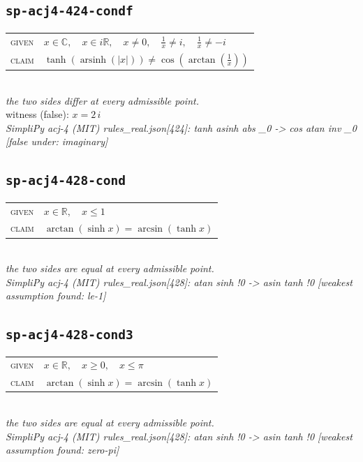 \documentclass[11pt]{article}
\begin{document}
\subsection*{\texttt{sp-acj4-424-condf}}
\begin{tabular}{@{}l@{\quad}l@{}}
\textsc{given} & $x \in \mathbb{C},\quad x \in i\mathbb{R},\quad x \neq 0,\quad \frac{1}{x} \neq i,\quad \frac{1}{x} \neq -i$ \\[4pt]
\textsc{claim} & $\displaystyle \tanh\left(\operatorname{arsinh}\left(\left|x\right|\right)\right) \neq \cos\left(\arctan\left(\frac{1}{x}\right)\right)$ \\
\end{tabular}\\[2pt]
{\small\emph{the two sides differ at every admissible point.}}\\
{\footnotesize\color{gray}witness (false): $x = 2 \, i$}\\
\emph{SimpliPy acj-4 (MIT) rules\_real.json[424]: tanh asinh abs \_0  ->  cos atan inv \_0  [false under: imaginary]}\\

\subsection*{\texttt{sp-acj4-428-cond}}
\begin{tabular}{@{}l@{\quad}l@{}}
\textsc{given} & $x \in \mathbb{R},\quad x \le 1$ \\[4pt]
\textsc{claim} & $\displaystyle \arctan\left(\sinh x\right) = \arcsin\left(\tanh x\right)$ \\
\end{tabular}\\[2pt]
{\small\emph{the two sides are equal at every admissible point.}}\\
\emph{SimpliPy acj-4 (MIT) rules\_real.json[428]: atan sinh !0  ->  asin tanh !0  [weakest assumption found: le-1]}\\

\subsection*{\texttt{sp-acj4-428-cond3}}
\begin{tabular}{@{}l@{\quad}l@{}}
\textsc{given} & $x \in \mathbb{R},\quad x \ge 0,\quad x \le \pi$ \\[4pt]
\textsc{claim} & $\displaystyle \arctan\left(\sinh x\right) = \arcsin\left(\tanh x\right)$ \\
\end{tabular}\\[2pt]
{\small\emph{the two sides are equal at every admissible point.}}\\
\emph{SimpliPy acj-4 (MIT) rules\_real.json[428]: atan sinh !0  ->  asin tanh !0  [weakest assumption found: zero-pi]}\\
\end{document}
